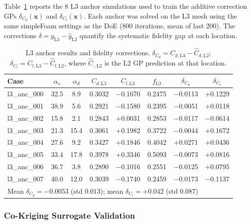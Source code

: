 Table~\ref{tab:l3_anchors_results} reports the 8 L3 anchor simulations used to train the additive correction GPs $\delta_{C_d}(\mathbf{x})$ and $\delta_{C_l}(\mathbf{x})$. Each anchor was solved on the L3 mesh using the same simpleFoam settings as the DoE (800 iterations, mean of last 200). The corrections $\delta = y_\mathrm{L3} - \hat{y}_\mathrm{L2}$ quantify the systematic fidelity gap at each location.

\begin{table}[h]
  \centering
  \caption{L3 anchor results and fidelity corrections. $\delta_{C_d} = C_{d,\mathrm{L3}} - \hat{C}_{d,\mathrm{L2}}$; $\delta_{C_l} = C_{l,\mathrm{L3}} - \hat{C}_{l,\mathrm{L2}}$, where $\hat{C}_{\cdot,\mathrm{L2}}$ is the L2 GP prediction at that location.}
  \label{tab:l3_anchors_results}
  \begin{tabular}{lccccccc}
    \toprule
    Case & $\alpha_s$ & $\alpha_d$ & $C_{d,\mathrm{L3}}$ & $C_{l,\mathrm{L3}}$ & $f_{\mathrm{L3}}$ & $\delta_{C_d}$ & $\delta_{C_l}$ \\
    \midrule
    l3\_anc\_000 & 32.5 &  8.9 & 0.3032 & $-$0.1670 & 0.2475 & $-$0.0113 & $+$0.1229 \\
    l3\_anc\_001 & 38.9 &  5.6 & 0.2921 & $-$0.1580 & 0.2395 & $-$0.0051 & $+$0.0118 \\
    l3\_anc\_002 & 15.8 &  2.1 & 0.2843 & $+$0.0031 & 0.2853 & $-$0.0117 & $-$0.0614 \\
    l3\_anc\_003 & 21.3 & 15.4 & 0.3061 & $+$0.1982 & 0.3722 & $-$0.0044 & $+$0.1672 \\
    l3\_anc\_004 & 27.6 &  9.2 & 0.3427 & $+$0.1846 & 0.4042 & $+$0.0271 & $+$0.0436 \\
    l3\_anc\_005 & 33.4 & 17.8 & 0.3978 & $+$0.3346 & 0.5093 & $-$0.0073 & $+$0.0816 \\
    l3\_anc\_006 & 36.7 &  3.8 & 0.2890 & $-$0.1016 & 0.2551 & $-$0.0125 & $+$0.0795 \\
    l3\_anc\_007 & 40.0 & 12.0 & 0.3039 & $-$0.1740 & 0.2459 & $-$0.0173 & $-$0.1137 \\
    \midrule
    \multicolumn{7}{l}{\footnotesize Mean $\delta_{C_d} = -0.0053$ (std $0.013$); mean $\delta_{C_l} = +0.042$ (std $0.087$)} \\
    \bottomrule
  \end{tabular}
\end{table}

\subsubsection{Co-Kriging Surrogate Validation}

